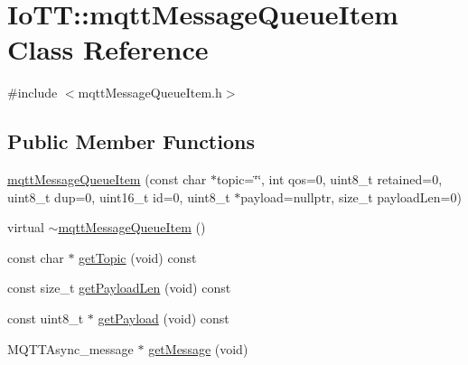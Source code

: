 \hypertarget{classIoTT_1_1mqttMessageQueueItem}{}\section{Io\+TT\+:\+:mqtt\+Message\+Queue\+Item Class Reference}
\label{classIoTT_1_1mqttMessageQueueItem}


{\ttfamily \#include $<$mqtt\+Message\+Queue\+Item.\+h$>$}

\subsection*{Public Member Functions}
\begin{DoxyCompactItemize}
\item 
\hyperlink{classIoTT_1_1mqttMessageQueueItem_a48f9b083e9734d17b727571f94f32d5d}{mqtt\+Message\+Queue\+Item} (const char $\ast$topic=\char`\"{}\char`\"{}, int qos=0, uint8\+\_\+t retained=0, uint8\+\_\+t dup=0, uint16\+\_\+t id=0, uint8\+\_\+t $\ast$payload=nullptr, size\+\_\+t payload\+Len=0)
\item 
virtual \hyperlink{classIoTT_1_1mqttMessageQueueItem_ad4c01d61e21f52e0e85f96792e4abfe5}{$\sim$mqtt\+Message\+Queue\+Item} ()
\item 
const char $\ast$ \hyperlink{classIoTT_1_1mqttMessageQueueItem_ad3e4931a0c385be4b976a090532da4f0}{get\+Topic} (void) const
\item 
const size\+\_\+t \hyperlink{classIoTT_1_1mqttMessageQueueItem_a331f0d28f6c0724da40592f2634037e9}{get\+Payload\+Len} (void) const
\item 
const uint8\+\_\+t $\ast$ \hyperlink{classIoTT_1_1mqttMessageQueueItem_a8a5ec64a1544aea421c93cd9fd1c32d5}{get\+Payload} (void) const
\item 
M\+Q\+T\+T\+Async\+\_\+message $\ast$ \hyperlink{classIoTT_1_1mqttMessageQueueItem_a7d48a0772c02fb72fc74b4f2e759cee5}{get\+Message} (void)
\end{DoxyCompactItemize}
